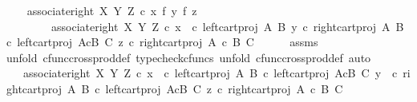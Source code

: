 \begin{isabellebody}
%
\isadelimproof
%
\endisadelimproof
%
\isatagproof
{}\isamarkupfalse%
{\isacharminus}{\kern0pt}\isanewline
\ \ \isamarkupfalse%
\ {\isachardoublequoteopen}associate{\isacharunderscore}{\kern0pt}right\ X\ Y\ Z\ {\isasymcirc}\isactrlsub c\ {\isacharparenleft}{\kern0pt}{\isacharparenleft}{\kern0pt}x\ {\isasymtimes}\isactrlsub f\ y{\isacharparenright}{\kern0pt}\ {\isasymtimes}\isactrlsub f\ z{\isacharparenright}{\kern0pt}\ {\isacharequal}{\kern0pt}\isanewline
\ \ \ \ \ \ \ \ associate{\isacharunderscore}{\kern0pt}right\ X\ Y\ Z\ {\isasymcirc}\isactrlsub c\ {\isasymlangle}{\isasymlangle}x\ \ {\isasymcirc}\isactrlsub c\ left{\isacharunderscore}{\kern0pt}cart{\isacharunderscore}{\kern0pt}proj\ A\ B{\isacharcomma}{\kern0pt}\ y\ {\isasymcirc}\isactrlsub c\ right{\isacharunderscore}{\kern0pt}cart{\isacharunderscore}{\kern0pt}proj\ A\ B{\isasymrangle}\ {\isasymcirc}\isactrlsub c\ left{\isacharunderscore}{\kern0pt}cart{\isacharunderscore}{\kern0pt}proj\ {\isacharparenleft}{\kern0pt}A{\isasymtimes}\isactrlsub cB{\isacharparenright}{\kern0pt}\ C{\isacharcomma}{\kern0pt}\ z\ {\isasymcirc}\isactrlsub c\ right{\isacharunderscore}{\kern0pt}cart{\isacharunderscore}{\kern0pt}proj\ {\isacharparenleft}{\kern0pt}A\ {\isasymtimes}\isactrlsub c\ B{\isacharparenright}{\kern0pt}\ C{\isasymrangle}{\isachardoublequoteclose}\isanewline
\ \ \ \ \isamarkupfalse%
\ assms\ \isamarkupfalse%
{\isacharparenleft}{\kern0pt}unfold\ cfunc{\isacharunderscore}{\kern0pt}cross{\isacharunderscore}{\kern0pt}prod{\isacharunderscore}{\kern0pt}def{}{\isacharcomma}{\kern0pt}\ typecheck{\isacharunderscore}{\kern0pt}cfuncs{\isacharcomma}{\kern0pt}\ unfold\ cfunc{\isacharunderscore}{\kern0pt}cross{\isacharunderscore}{\kern0pt}prod{\isacharunderscore}{\kern0pt}def{}{\isacharcomma}{\kern0pt}\ auto{\isacharparenright}{\kern0pt}\ \isanewline
\ \ \isamarkupfalse%
\ \isamarkupfalse%
\ {\isachardoublequoteopen}{\isachardot}{\kern0pt}{\isachardot}{\kern0pt}{\isachardot}{\kern0pt}\ {\isacharequal}{\kern0pt}\ associate{\isacharunderscore}{\kern0pt}right\ X\ Y\ Z\ {\isasymcirc}\isactrlsub c\ {\isasymlangle}{\isasymlangle}x\ \ {\isasymcirc}\isactrlsub c\ left{\isacharunderscore}{\kern0pt}cart{\isacharunderscore}{\kern0pt}proj\ A\ B\ {\isasymcirc}\isactrlsub c\ left{\isacharunderscore}{\kern0pt}cart{\isacharunderscore}{\kern0pt}proj\ {\isacharparenleft}{\kern0pt}A{\isasymtimes}\isactrlsub cB{\isacharparenright}{\kern0pt}\ C{\isacharcomma}{\kern0pt}\ y\ \ {\isasymcirc}\isactrlsub c\ right{\isacharunderscore}{\kern0pt}cart{\isacharunderscore}{\kern0pt}proj\ A\ B\ {\isasymcirc}\isactrlsub c\ left{\isacharunderscore}{\kern0pt}cart{\isacharunderscore}{\kern0pt}proj\ {\isacharparenleft}{\kern0pt}A{\isasymtimes}\isactrlsub cB{\isacharparenright}{\kern0pt}\ C{\isasymrangle}{\isacharcomma}{\kern0pt}\ z\ {\isasymcirc}\isactrlsub c\ right{\isacharunderscore}{\kern0pt}cart{\isacharunderscore}{\kern0pt}proj\ {\isacharparenleft}{\kern0pt}A\ {\isasymtimes}\isactrlsub c\ B{\isacharparenright}{\kern0pt}\ C{\isasymrangle}{\isachardoublequoteclose}\isanewline

\end{isabellebody}
